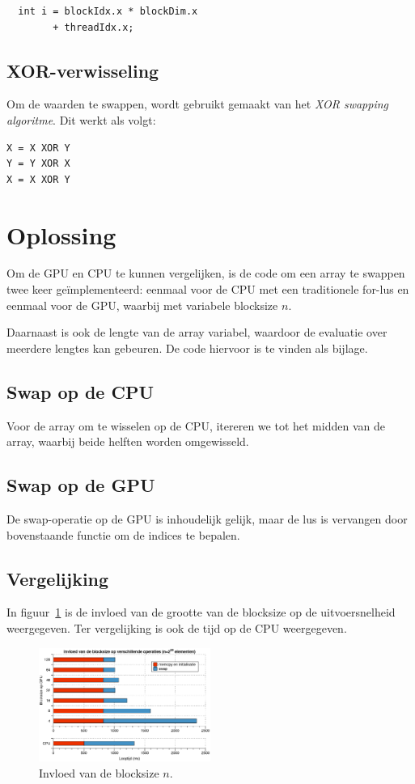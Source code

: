 \documentclass[10pt, twocolumn, a4paper]{article}
\begin{document}
\begin{verbatim}
  int i = blockIdx.x * blockDim.x 
		+ threadIdx.x;
\end{verbatim}

\subsection{XOR-verwisseling}
Om de waarden te swappen, wordt gebruikt gemaakt van het \emph{XOR swapping algoritme}. Dit werkt als volgt:

\begin{verbatim}
X = X XOR Y
Y = Y XOR X
X = X XOR Y
\end{verbatim}

\section{Oplossing}
Om de GPU en CPU te kunnen vergelijken, is de code om een array te swappen twee keer ge\"implementeerd: eenmaal voor de CPU met een traditionele for-lus en eenmaal voor de GPU, waarbij met variabele blocksize $n$.

Daarnaast is ook de lengte van de array variabel, waardoor de evaluatie over meerdere lengtes kan gebeuren. De code hiervoor is te vinden als bijlage.

\subsection{Swap op de CPU}
Voor de array om te wisselen op de CPU, itereren we tot het midden van de array, waarbij beide helften worden omgewisseld.

\subsection{Swap op de GPU}
De swap-operatie op de GPU is inhoudelijk gelijk, maar de lus is vervangen door bovenstaande functie om de indices te bepalen. 

\subsection{Vergelijking}
In figuur~\ref{blocksize} is de invloed van de grootte van de blocksize op de uitvoersnelheid weergegeven. Ter vergelijking is ook de tijd op de CPU weergegeven.

\begin{figure}
\centering
\includegraphics[width=0.5\textwidth]{blocksize.eps}
\caption{Invloed van de blocksize $n$.}
\label{blocksize}
\end{figure}
\end{document}
